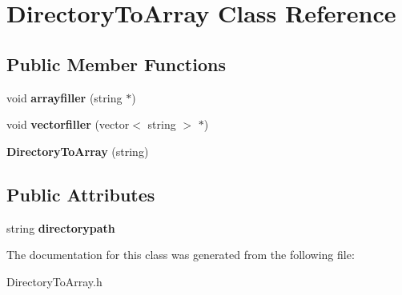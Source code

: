 \hypertarget{class_directory_to_array}{\section{Directory\-To\-Array Class Reference}
\label{class_directory_to_array}
}
\subsection*{Public Member Functions}
\begin{DoxyCompactItemize}
\item 
\hypertarget{class_directory_to_array_abcd5fc04969c5be6d15bcb169a9ccb37}{void {\bfseries arrayfiller} (string $\ast$)}\label{class_directory_to_array_abcd5fc04969c5be6d15bcb169a9ccb37}

\item 
\hypertarget{class_directory_to_array_a37442a303b1af59c919384509c93a6cb}{void {\bfseries vectorfiller} (vector$<$ string $>$ $\ast$)}\label{class_directory_to_array_a37442a303b1af59c919384509c93a6cb}

\item 
\hypertarget{class_directory_to_array_ad4f0fff7cd61da0b183bab0cc94ebd3c}{{\bfseries Directory\-To\-Array} (string)}\label{class_directory_to_array_ad4f0fff7cd61da0b183bab0cc94ebd3c}

\end{DoxyCompactItemize}
\subsection*{Public Attributes}
\begin{DoxyCompactItemize}
\item 
\hypertarget{class_directory_to_array_a48473e575746494d8ad5ade05b6d339e}{string {\bfseries directorypath}}\label{class_directory_to_array_a48473e575746494d8ad5ade05b6d339e}

\end{DoxyCompactItemize}


The documentation for this class was generated from the following file\-:\begin{DoxyCompactItemize}
\item 
Directory\-To\-Array.\-h\end{DoxyCompactItemize}
